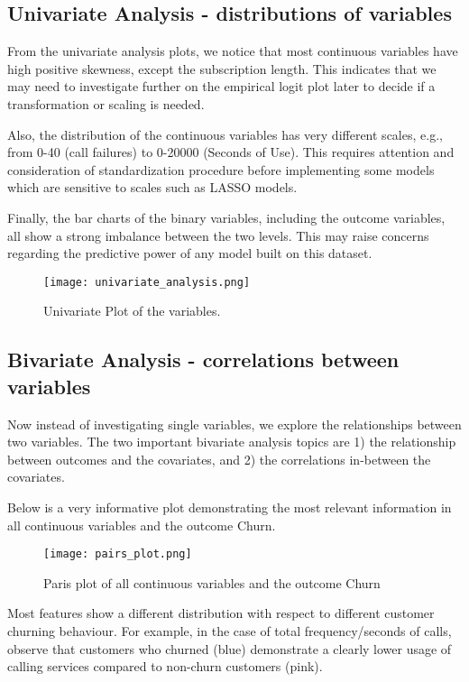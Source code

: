 \documentclass[11pt]{article}
\begin{document}
\subsection{Univariate Analysis - distributions of variables}

From the univariate analysis plots, we notice that most continuous variables have high positive skewness, except the subscription length. This indicates that we may need to investigate further on the empirical logit plot later to decide if a transformation or scaling is needed. 

Also, the distribution of the continuous variables has very different scales, e.g., from 0-40 (call failures) to 0-20000 (Seconds of Use). This requires attention and consideration of standardization procedure before implementing some models which are sensitive to scales such as LASSO models. 

Finally, the bar charts of the binary variables, including the outcome variables, all show a strong imbalance between the two levels. This may raise concerns regarding the predictive power of any model built on this dataset. 


\begin{figure}[H]
    \centering
    \texttt{[image: univariate\_analysis.png]}
    \caption{Univariate Plot of the variables.}
    \label{fig:univariate}
\end{figure}

\subsection{Bivariate Analysis - correlations between variables}

Now instead of investigating single variables, we explore the relationships between two variables. The two important bivariate analysis topics are 1) the relationship between outcomes and the covariates, and 2) the correlations in-between the covariates. 

Below is a very informative plot demonstrating the most relevant information in all continuous variables and the outcome Churn. 

\begin{figure}[H]
    \centering
    \texttt{[image: pairs\_plot.png]}
    \caption{Paris plot of all continuous variables and the outcome Churn}
    \label{fig:pairsplot}
\end{figure}

Most features show a different distribution with respect to different customer churning behaviour. For example,  in the case of total frequency/seconds of calls, observe that customers who churned (blue) demonstrate a clearly lower usage of calling services compared to non-churn customers (pink). 
\end{document}
